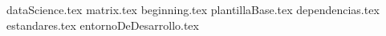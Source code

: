 \documentclass[11pt,oneside]{book}%
\begin{document}
	{dataScience.tex}
	{matrix.tex}
	\frontmatter
		\tableofcontents
		{beginning.tex} 
	\mainmatter
	{plantillaBase.tex}
	{dependencias.tex}
	{estandares.tex}
	{entornoDeDesarrollo.tex}
\end{document}

